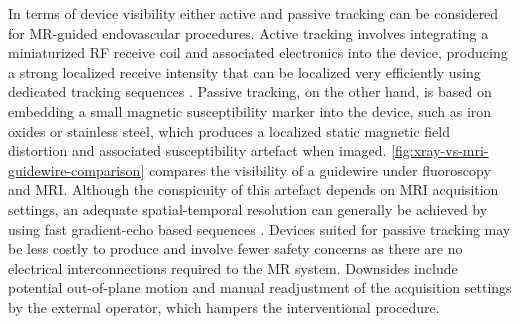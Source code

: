\documentclass[conference]{IEEEtran}
\begin{document}
In terms of device visibility either active and passive tracking can be considered for MR-guided endovascular procedures. Active tracking involves integrating a miniaturized RF receive coil and associated electronics into the device, producing a strong localized receive intensity that can be localized very efficiently using dedicated tracking sequences \cite{pmid11146480}. Passive  tracking, on  the  other  hand, is based on embedding a small magnetic susceptibility marker into the device, such as iron oxides or stainless steel, which produces a localized static magnetic field distortion and associated susceptibility artefact when imaged. \autoref{fig:xray-vs-mri-guidewire-comparison} compares the visibility of a guidewire under fluoroscopy and MRI. Although the conspicuity of this artefact depends on MRI acquisition settings, an adequate spatial-temporal resolution can generally be achieved by using fast gradient-echo based sequences \cite{pmid11146480}. Devices suited for passive tracking may be less costly to produce and involve fewer safety concerns as there are no electrical interconnections required to the MR system. Downsides include potential out-of-plane motion and manual readjustment of the acquisition settings by the external operator, which hampers the interventional procedure.
\end{document}
